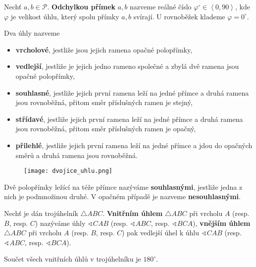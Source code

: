 \begin{definition}
  Nechť $a,b\in \mathscr P.$ \textbf{Odchylkou přímek} $a,b$ nazveme reálné číslo $\varphi^\circ\in \left <0, 90\right>$, kde $\varphi$ je velikost úhlu, který spolu přímky $a,b$ svírají. U rovnoběžek klademe $\varphi = 0^\circ.$
\end{definition}

\begin{definition}
  Dva úhly nazveme
  \begin{itemize}
    \item \textbf{vrcholové}, jestliže jsou jejich ramena opačné polopřímky,
    \item \textbf{vedlejší}, jestliže je jejich jedno rameno společné a zbylá dvě ramena jsou opačné polopřímky,
    \item \textbf{souhlasné}, jestliže jejich první ramena leží na jedné přímce a druhá ramena jsou rovnoběžná, přitom směr příslušných ramen je stejný,
    \item \textbf{střídavé}, jestliže jejich první ramena leží na jedné přímce a druhá ramena jsou rovnoběžná, přitom směr příslušných ramen je opačný,
    \item \textbf{přilehlé}, jestliže jejich první ramena leží na jedné přímce a jdou do opačných směrů a druhá ramena jsou rovnoběžná.
  \end{itemize}
  \begin{figure}[h!]
    \centering
    \texttt{[image: dvojice\_uhlu.png]}
  \end{figure}
\end{definition}


\begin{definition}
  Dvě polopřímky ležící na téže přímce nazýváme \textbf{souhlasnými}, jestliže jedna z nich je podmnožinou druhé. V opačném případě je nazveme \textbf{nesouhlasnými}.
\end{definition}

\begin{definition}
  Nechť je dán trojúhelník $\triangle ABC$. \textbf{Vnitřním úhlem} $\triangle ABC$ při vrcholu $A$ (resp. $B$, resp. $C$)
  nazýváme úhly $\sphericalangle CAB$ (resp. $\sphericalangle ABC$, resp. $ \sphericalangle BCA$), \textbf{vnějším úhlem}
  $\triangle ABC$ při vrcholu $A$ (resp. $B$, resp. $C$) pak vedlejší úhel k úhlu $\sphericalangle CAB$ (resp. $\sphericalangle ABC$, resp. $\sphericalangle BCA$).
\end{definition}

\begin{veta}
  Součet všech vnitřních úhlů v trojúhelníku je $180^\circ$.
\end{veta}

